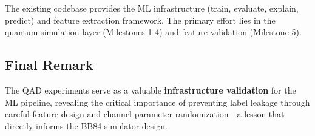 The existing codebase provides the ML infrastructure (train, evaluate, explain, predict) and feature extraction framework. The primary effort lies in the quantum simulation layer (Milestones 1-4) and feature validation (Milestone 5).

\subsection{Final Remark}
The QAD experiments serve as a valuable \textbf{infrastructure validation} for the ML pipeline, revealing the critical importance of preventing label leakage through careful feature design and channel parameter randomization---a lesson that directly informs the BB84 simulator design.